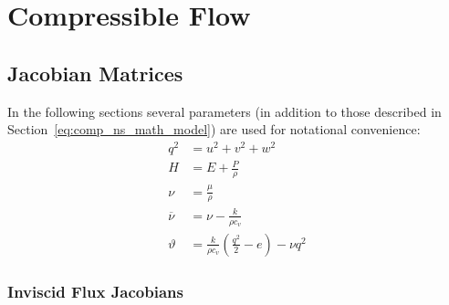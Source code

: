\chapter{Compressible Flow \label{app:compressible}}



\newcommand{\gmo}{\gamma-1}
\newcommand{\omg}{1-\gamma}
\newcommand{\tmg}{3-\gamma}
\newcommand{\otnu}{\frac{1}{3}\nu}
\newcommand{\ttnu}{\frac{2}{3}\nu}
\newcommand{\ftnu}{\frac{4}{3}\nu}
\newcommand{\kCvr}{\frac{k}{\rho c_v}}
\newcommand{\nubar}{\overline{\nu}}




\section{Jacobian Matrices\label{compressible_jacobian_matrices}}

In the following sections several parameters (in addition to those described in Section~\ref{eq:comp_ns_math_model}) are used for notational convenience:
\begin{align}
  q^2 &= u^2 + v^2 + w^2\nonumber \\
  H   &= E + \frac{P}{\rho} \nonumber \\
  \nu &= \frac{\mu}{\rho}  \nonumber \\
  \nubar &= \nu - \kCvr \nonumber \\
  \vartheta &= \kCvr\left(\frac{q^2}{2} - e\right) - \nu q^2 \nonumber
\end{align}
 
\subsection{Inviscid Flux Jacobians \label{app:inviscid_jacobians}}

